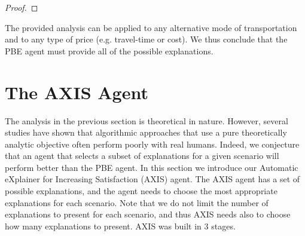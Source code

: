 \documentclass[letterpaper]{article} %
\begin{document}
\begin{proof}

\end{proof}

The provided analysis can be applied to any alternative mode of transportation and to any type of price (e.g. travel-time or cost). We thus conclude that the PBE agent must provide all of the possible explanations.










%
%

\section{The AXIS Agent}
\label{sec:AXIS}
The analysis in the previous section is theoretical in nature. However, several studies have shown that algorithmic approaches that use a pure theoretically analytic objective often perform poorly with real humans. Indeed, we conjecture that an agent that selects a subset of explanations for a given scenario will perform better than the PBE agent.
In this section we introduce our Automatic eXplainer for Increasing Satisfaction (AXIS) agent.
The AXIS agent has a set of possible explanations, and the agent needs to choose the most appropriate explanations for each scenario. Note that we do not limit the number of explanations to present for each scenario, and thus AXIS needs also to choose how many explanations to present. AXIS was built in $3$ stages.
\end{document}
